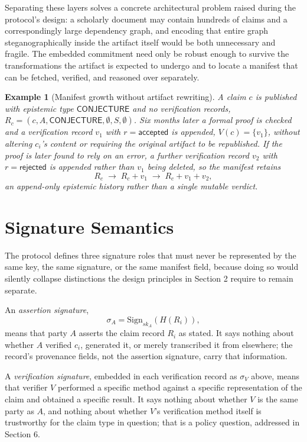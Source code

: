 \documentclass[11pt]{article}
\newtheorem{example}{Example}
\begin{document}
Separating these layers solves a concrete architectural problem raised during the protocol's design: a scholarly document may contain hundreds of claims and a correspondingly large dependency graph, and encoding that entire graph steganographically inside the artifact itself would be both unnecessary and fragile. The embedded commitment need only be robust enough to survive the transformations the artifact is expected to undergo and to locate a manifest that can be fetched, verified, and reasoned over separately.

\begin{example}[Manifest growth without artifact rewriting]
A claim $c$ is published with epistemic type $\textsf{CONJECTURE}$ and no verification records, $R_c = (c, A, \textsf{CONJECTURE}, \emptyset, S, \emptyset)$. Six months later a formal proof is checked and a verification record $v_1$ with $r = \textsf{accepted}$ is appended, $V(c) = \{v_1\}$, without altering $c_i$'s content or requiring the original artifact to be republished. If the proof is later found to rely on an error, a further verification record $v_2$ with $r = \textsf{rejected}$ is appended rather than $v_1$ being deleted, so the manifest retains
\[
R_c \;\longrightarrow\; R_c + v_1 \;\longrightarrow\; R_c + v_1 + v_2,
\]
an append-only epistemic history rather than a single mutable verdict.
\end{example}

\section{Signature Semantics}

The protocol defines three signature roles that must never be represented by the same key, the same signature, or the same manifest field, because doing so would silently collapse distinctions the design principles in Section 2 require to remain separate.

An \emph{assertion signature},
\[
\sigma_A = \mathrm{Sign}_{sk_A}(H(R_i)),
\]
means that party $A$ asserts the claim record $R_i$ as stated. It says nothing about whether $A$ verified $c_i$, generated it, or merely transcribed it from elsewhere; the record's provenance fields, not the assertion signature, carry that information.

A \emph{verification signature}, embedded in each verification record as $\sigma_V$ above, means that verifier $V$ performed a specific method against a specific representation of the claim and obtained a specific result. It says nothing about whether $V$ is the same party as $A$, and nothing about whether $V$'s verification method itself is trustworthy for the claim type in question; that is a policy question, addressed in Section 6.
\end{document}
